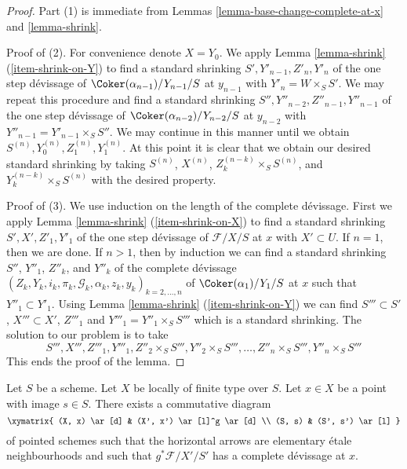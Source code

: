 \begin{proof}
Part (1) is immediate from
Lemmas \ref{lemma-base-change-complete-at-x} and
\ref{lemma-shrink}.

\medskip\noindent
Proof of (2). For convenience denote $X = Y_0$. We apply
Lemma \ref{lemma-shrink} (\ref{item-shrink-on-Y})
to find a standard shrinking
$S', Y'_{n - 1}, Z'_n, Y'_n$
of the one step d\'evissage of $\Coker(\alpha_{n - 1})/Y_{n - 1}/S$
at $y_{n - 1}$ with $Y'_n = W \times_S S'$. We may repeat this procedure
and find a standard shrinking
$S'', Y''_{n - 2}, Z''_{n - 1}, Y''_{n - 1}$
of the one step d\'evissage of $\Coker(\alpha_{n - 2})/Y_{n - 2}/S$
at $y_{n - 2}$ with $Y''_{n - 1} = Y'_{n - 1} \times_S S''$.
We may continue in this manner until we obtain
$S^{(n)}, Y^{(n)}_0, Z^{(n)}_1, Y^{(n)}_1$.
At this point it is clear that we obtain our desired standard shrinking
by taking $S^{(n)}$, $X^{(n)}$, $Z_k^{(n - k)} \times_S S^{(n)}$, and
$Y_k^{(n - k)} \times_S S^{(n)}$ with the desired property.

\medskip\noindent
Proof of (3). We use induction on the length of the complete
d\'evissage. First we apply
Lemma \ref{lemma-shrink} (\ref{item-shrink-on-X})
to find a standard shrinking
$S', X', Z'_1, Y'_1$
of the one step d\'evissage of $\mathcal{F}/X/S$ at $x$
with $X' \subset U$. If $n = 1$, then we are done.
If $n > 1$, then by induction we can find a standard shrinking
$S''$, $Y''_1$, $Z''_k$, and $Y''_k$ of the complete d\'evissage
$(Z_k, Y_k, i_k, \pi_k, \mathcal{G}_k, \alpha_k, z_k, y_k)_{k = 2, \ldots, n}$
of $\Coker(\alpha_1)/Y_1/S$ at $x$ such that
$Y''_1 \subset Y'_1$. Using
Lemma \ref{lemma-shrink} (\ref{item-shrink-on-Y})
we can find $S''' \subset S'$, $X''' \subset X'$, $Z'''_1$ and
$Y'''_1 = Y''_1 \times_S S'''$ which is a standard shrinking.
The solution to our problem is to take
$$
S''', X''', Z'''_1, Y'''_1, Z''_2 \times_S S''',
Y''_2 \times_S S''', \ldots, Z''_n \times_S S''', Y''_n \times_S S'''
$$
This ends the proof of the lemma.
\end{proof}

\begin{proposition}
\label{proposition-existence-complete-at-x}
Let $S$ be a scheme.
Let $X$ be locally of finite type over $S$.
Let $x \in X$ be a point with image $s \in S$.
There exists a commutative diagram
$$
\xymatrix{
(X, x) \ar[d] & (X', x') \ar[l]^g \ar[d] \\
(S, s) & (S', s') \ar[l]
}
$$
of pointed schemes such that the horizontal
arrows are elementary \'etale neighbourhoods
and such that $g^*\mathcal{F}/X'/S'$ has a complete
d\'evissage at $x$.
\end{proposition}

